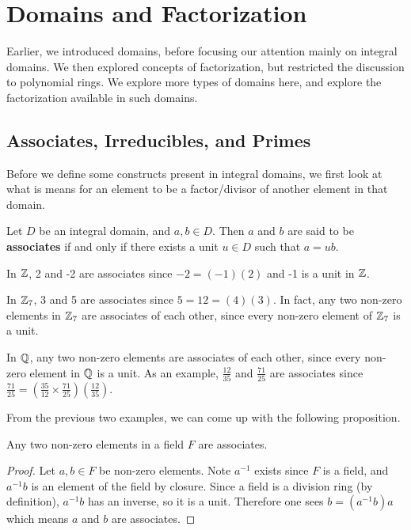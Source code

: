 \chapter{Domains and Factorization}
Earlier, we introduced domains, before focusing our attention mainly on integral domains. We then explored concepts of factorization, but restricted the discussion to polynomial rings. We explore more types of domains here, and explore the factorization available in such domains.

\section{Associates, Irreducibles, and Primes}
Before we define some constructs present in integral domains, we first look at what is means for an element to be a factor/divisor of another element in that domain.

\begin{definition}
    Let $D$ be an integral domain, and $a,b \in D$. Then $a$ and $b$ are said to be \textbf{associates} if and only if there exists a unit $u \in D$ such that $a = ub$.
\end{definition}

\begin{example}
    In $\mathbb{Z}$, 2 and -2 are associates since $-2 = (-1)(2)$ and -1 is a unit in $\mathbb{Z}$.
\end{example}

\begin{example}
    In $\mathbb{Z}_7$, 3 and 5 are associates since $5 = 12 = (4)(3)$. In fact, any two non-zero elements in $\mathbb{Z}_7$ are associates of each other, since every non-zero element of $\mathbb{Z}_7$ is a unit.
\end{example}

\begin{example}
    In $\mathbb{Q}$, any two non-zero elements are associates of each other, since every non-zero element in $\mathbb{Q}$ is a unit. As an example, $\frac{12}{35}$ and $\frac{71}{25}$ are associates since $\frac{71}{25} = \left(\frac{35}{12} \times \frac{71}{25}\right)\left(\frac{12}{35}\right)$.
\end{example}

From the previous two examples, we can come up with the following proposition.

\begin{proposition}
    Any two non-zero elements in a field $F$ are associates.
\end{proposition}
\begin{proof}
    Let $a, b \in F$ be non-zero elements. Note $a^{-1}$ exists since $F$ is a field, and $a^{-1}b$ is an element of the field by closure. Since a field is a division ring (by definition), $a^{-1}b$ has an inverse, so it is a unit. Therefore one sees $b = (a^{-1}b)a$ which means $a$ and $b$ are associates.
\end{proof}

